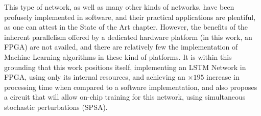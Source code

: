 This type of network, as well as many other kinds of networks, have been profusely implemented
in software, and their practical applications are plentiful, as one can attest
in the State of the Art chapter. However, the benefits of the inherent parallelism offered by a dedicated hardware platform
(in this work, an FPGA) are not availed, and there are relatively few the implementation of Machine Learning algorithms in
these kind of platforms. It is within this grounding that this work positions itself, implementing an LSTM Network in FPGA, using only its internal resources, and achieving an $\times195$ increase in processing time when compared to a software implementation, and also proposes a circuit that will allow on-chip training for this network, using simultaneous stochastic perturbations (SPSA).


